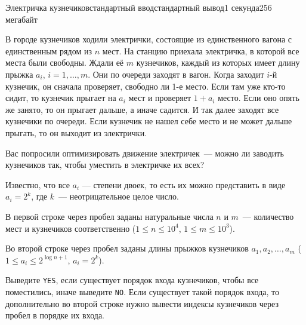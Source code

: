 \begin{problem}{Электричка кузнечиков}{стандартный ввод}{стандартный вывод}{1 секунда}{256 мегабайт}

В городе кузнечиков ходили электрички, состоящие из единственного вагона с единственным рядом из $n$ мест. На станцию приехала электричка, в которой все места были свободны. Ждали её $m$ кузнечиков, каждый из которых имеет длину прыжка $a_{i}$, $i=1, \dots, m$. Они по очереди заходят в вагон. Когда заходит $i$-й кузнечик, он сначала проверяет, свободно ли 1-е место. Если там уже кто-то сидит, то кузнечик прыгает на $a_{i}$ мест и проверяет $1 + a_{i}$ место. Если оно опять же занято, то он прыгает дальше, а иначе садится. И так далее заходят все кузнечики по очереди. Если кузнечик не нашел себе место и не может дальше прыгать, то он выходит из электрички. 

Вас попросили оптимизировать движение электричек~--- можно ли заводить кузнечиков так, чтобы уместить в электричке их всех? 

Известно, что все $a_{i}$ --- степени двоек, то есть их можно представить в виде $a_{i} = 2^k$, где $k$~--- неотрицательное целое число.

\InputFile
В первой строке через пробел заданы натуральные числа $n$ и $m$~--- количество мест и кузнечиков соответственно ($1 \leq n \leq 10^4$, $1 \leq m \leq 10^3$).

Во второй строке через пробел заданы длины прыжков кузнечиков $a_{1}, a_{2}, \ldots, a_{m}$ ($1 \leq a_{i} \leq 2^{\log{n} + 1}$, $a_{i} = 2^k$).


\OutputFile
Выведите {\tt YES}, если существует порядок входа кузнечиков, чтобы все поместились, иначе выведите {\tt NO}.
Если существует такой порядок входа, то дополнительно во второй строке нужно вывести индексы кузнечиков через пробел в порядке их входа.

\Examples

\begin{example}
%
%
\end{example}

\end{problem}

